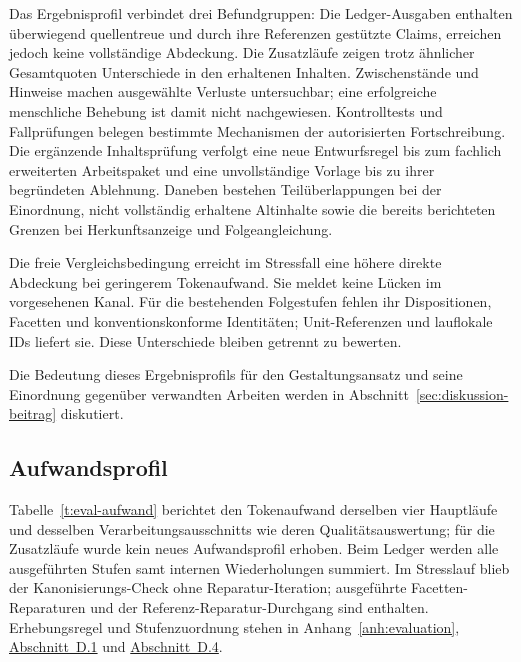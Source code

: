 

\begin{samepage}
Das Ergebnisprofil verbindet drei Befundgruppen: Die Ledger-Ausgaben
enthalten überwiegend quellentreue und durch ihre Referenzen gestützte
Claims, erreichen jedoch keine vollständige Abdeckung. Die Zusatzläufe
zeigen trotz ähnlicher Gesamtquoten Unterschiede in den erhaltenen
Inhalten. Zwischenstände und Hinweise machen ausgewählte
Verluste untersuchbar; eine erfolgreiche menschliche Behebung ist
damit nicht nachgewiesen. Kontrolltests und Fallprüfungen belegen
bestimmte Mechanismen der autorisierten Fortschreibung. Die ergänzende
Inhaltsprüfung verfolgt eine neue Entwurfsregel bis zum fachlich
erweiterten Arbeitspaket und eine unvollständige Vorlage bis zu ihrer
begründeten Ablehnung. Daneben bestehen Teilüberlappungen bei der
Einordnung, nicht vollständig erhaltene Altinhalte sowie die bereits
berichteten Grenzen bei Herkunftsanzeige und Folgeangleichung.
\par
\end{samepage}

Die freie Vergleichsbedingung erreicht im Stressfall eine höhere
direkte Abdeckung bei geringerem Tokenaufwand. Sie meldet keine
Lücken im vorgesehenen Kanal. Für die bestehenden Folgestufen fehlen
ihr Dispositionen, Facetten und konventionskonforme Identitäten;
Unit-Referenzen und lauflokale IDs liefert sie. Diese Unterschiede
bleiben getrennt zu bewerten.

Die Bedeutung dieses Ergebnisprofils für den Gestaltungsansatz und
seine Einordnung gegenüber verwandten Arbeiten werden in
Abschnitt~\ref{sec:diskussion-beitrag} diskutiert.

\subsection{Aufwandsprofil}
\label{sec:eval-aufwand}

Tabelle~\ref{t:eval-aufwand} berichtet den Tokenaufwand derselben
vier Hauptläufe und desselben Verarbeitungsausschnitts wie deren
Qualitätsauswertung; für die Zusatzläufe wurde kein neues Aufwandsprofil
erhoben.
Beim Ledger werden alle ausgeführten Stufen samt internen
Wiederholungen summiert. Im Stresslauf blieb der Kanonisierungs-Check
ohne Reparatur-Iteration; ausgeführte Facetten-Reparaturen und der
Referenz-Reparatur-Durchgang sind enthalten. Erhebungsregel und
Stufenzuordnung stehen in Anhang~\ref{anh:evaluation},
\hyperref[anh:hauptlaeufe]{Abschnitt~D.1} und
\hyperref[anh:pruefartefakte]{Abschnitt~D.4}.

